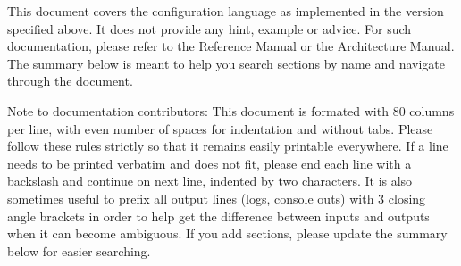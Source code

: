 This document covers the configuration language as implemented in the version
specified above. It does not provide any hint, example or advice. For such
documentation, please refer to the Reference Manual or the Architecture Manual.
The summary below is meant to help you search sections by name and navigate
through the document.

\begin{note}{Note to documentation contributors:}
This document is formated with 80 columns per line, with even number of
spaces for indentation and without tabs. Please follow these rules strictly
so that it remains easily printable everywhere. If a line needs to be
printed verbatim and does not fit, please end each line with a backslash
\chr{\bslash} and continue on next line, indented by two characters. It is also
sometimes useful to prefix all output lines (logs, console outs) with 3
closing angle brackets \chr{\gttt} in order to help get the difference between
inputs and outputs when it can become ambiguous. If you add sections,
please update the summary below for easier searching.
\end{note}